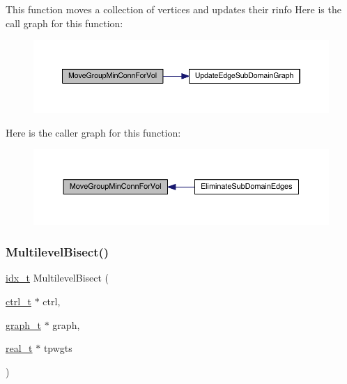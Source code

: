 This function moves a collection of vertices and updates their rinfo Here is the call graph for this function\+:\nopagebreak
\begin{figure}[H]
\begin{center}
\leavevmode
\includegraphics[width=350pt]{a00945_acab0293e31c438218cd4b37b608466c6_cgraph}
\end{center}
\end{figure}
Here is the caller graph for this function\+:\nopagebreak
\begin{figure}[H]
\begin{center}
\leavevmode
\includegraphics[width=350pt]{a00945_acab0293e31c438218cd4b37b608466c6_icgraph}
\end{center}
\end{figure}
\mbox{\label{a00945_a33c48a23cc94ea0221fa5c7317cd0222}} 
\subsubsection{\texorpdfstring{Multilevel\+Bisect()}{MultilevelBisect()}}
{\footnotesize\ttfamily \hyperlink{a00876_aaa5262be3e700770163401acb0150f52}{idx\+\_\+t} Multilevel\+Bisect (\begin{DoxyParamCaption}\item[{\hyperlink{a00742}{ctrl\+\_\+t} $\ast$}]{ctrl,  }\item[{\hyperlink{a00734}{graph\+\_\+t} $\ast$}]{graph,  }\item[{\hyperlink{a00876_a1924a4f6907cc3833213aba1f07fcbe9}{real\+\_\+t} $\ast$}]{tpwgts }\end{DoxyParamCaption})}

